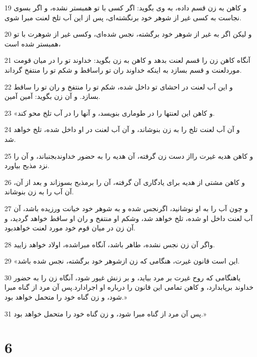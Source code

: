 \par 19 و کاهن به زن قسم داده، به وی بگوید: اگر کسی با تو همبستر نشده، و اگر بسوی نجاست به کسی غیر از شوهر خود برنگشته‌ای، پس از این آب تلخ لعنت مبرا شوی.
\par 20 و لیکن اگر به غیر از شوهر خود برگشته، نجس شده‌ای، وکسی غیر از شوهرت با تو همبستر شده است،
\par 21 آنگاه کاهن زن را قسم لعنت بدهد و کاهن به زن بگوید: خداوند تو را در میان قومت موردلعنت و قسم بسازد به اینکه خداوند ران تو راساقط و شکم تو را منتفخ گرداند.
\par 22 و این آب لعنت در احشای تو داخل شده، شکم تو را منتفخ و ران تو را ساقط بسازد. و آن زن بگوید: آمین آمین.
\par 23 «و کاهن این لعنتها را در طوماری بنویسد، و آنها را در آب تلخ محو کند.
\par 24 و آن آب لعنت تلخ را به زن بنوشاند، و آن آب لعنت در او داخل شده، تلخ خواهد شد.
\par 25 و کاهن هدیه غیرت رااز دست زن گرفته، آن هدیه را به حضور خداوندبجنباند، و آن را نزد مذبح بیاورد.
\par 26 و کاهن مشتی از هدیه برای یادگاری آن گرفته، آن را برمذبح بسوزاند و بعد از آن، آن آب را به زن بنوشاند.
\par 27 و چون آب را به او نوشانید، اگرنجس شده و به شوهر خود خیانت ورزیده باشد، آن آب لعنت داخل او شده، تلخ خواهد شد، وشکم او منتفخ و ران او ساقط خواهد گردید، و آن زن در میان قوم خود مورد لعنت خواهدبود.
\par 28 واگر آن زن نجس نشده، طاهر باشد، آنگاه مبراشده، اولاد خواهد زایید.
\par 29 «این است قانون غیرت، هنگامی که زن ازشوهر خود برگشته، نجس شده باشد.
\par 30 یاهنگامی که روح غیرت بر مرد بیاید، و بر زنش غیور شود، آنگاه زن را به حضور خداوند برپابدارد، و کاهن تمامی این قانون را درباره او اجرادارد.پس آن مرد از گناه مبرا شود، و زن گناه خود را متحمل خواهد بود.»
\par 31 پس آن مرد از گناه مبرا شود، و زن گناه خود را متحمل خواهد بود.»
 
\chapter{6}

